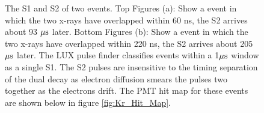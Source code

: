 \renewcommand{\baselinestretch}{1}
\small\normalsize
\begin{figure}[p!]\centering
 

\caption{The S1 and S2 of two \KrCal events. Top Figures (a): Show a \KrCal event in which the two x-rays have overlapped within 60 ns, the S2 arrives about 93 $\rm \mu s$ later. Bottom Figures (b): Show a \KrCal event in which the two x-rays have overlapped within 220 ns, the S2 arrives about 205 $\rm \mu s$ later. The LUX pulse finder classifies events within a 1$\rm \mu s$ window as a single S1. The S2 pulses are insensitive to the timing separation of the dual decay as electron diffusion smears the pulses two together as the electrons drift. The PMT hit map for these events are shown below in figure \ref{fig:Kr_Hit_Map}.}
\label{fig:Kr_Waveform}
\end{figure}
\renewcommand{\baselinestretch}{2}
\small\normalsize


